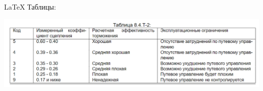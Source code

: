 \documentclass[utf8]{beamer}
\begin{document}
\begin{frame}{LaTeX}  
    Таблицы:

    \includegraphics[width=\textwidth]{lt12-a8-table.png}           
\end{frame}
\end{document}
